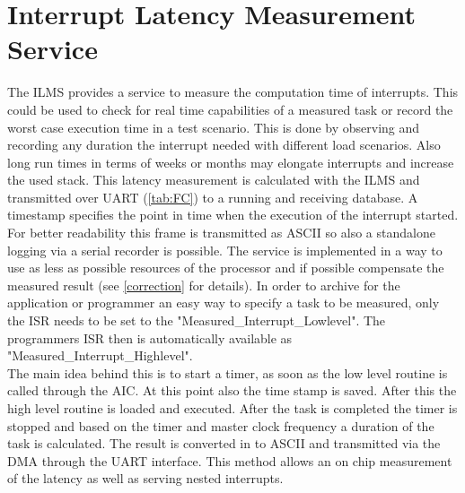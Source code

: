 
\chapter{Interrupt Latency Measurement Service}
\label{sec:ILMS}

The \acf{ILMS} provides a service to measure the computation time of interrupts. This could be used to check for real time capabilities of a measured task or record the worst case execution time in a test scenario. This is done by observing and recording any duration the interrupt needed with different load scenarios. Also long run times in terms of weeks or months may elongate interrupts and increase the used stack. This latency measurement is calculated with the \ac{ILMS} and transmitted over \ac{UART} (\autoref{tab:FC}) to a running and receiving database. A timestamp specifies the point in time when the execution of the interrupt started. For better readability this frame is transmitted as ASCII so also a standalone logging via a serial recorder is possible. The service is implemented in a way to use as less as possible resources of the processor and if possible compensate the measured result (see \ref{correction} for details). In order to archive for the application or programmer an easy way to specify a task to be measured, only the \ac{ISR} needs to be set to the "Measured\_Interrupt\_Lowlevel". The programmers \ac{ISR} then is automatically available as "Measured\_Interrupt\_Highlevel".\\
The main idea behind this is to start a timer, as soon as the low level routine is called through the \ac{AIC}. At this point also the time stamp is saved. After this the high level routine is loaded and executed. After the task is completed the timer is stopped and based on the timer and master clock frequency a duration of the task is calculated. The result is converted in to ASCII and transmitted via the \ac{DMA} through the \ac{UART} interface. This method allows an on chip measurement of the latency as well as serving nested interrupts.\\

